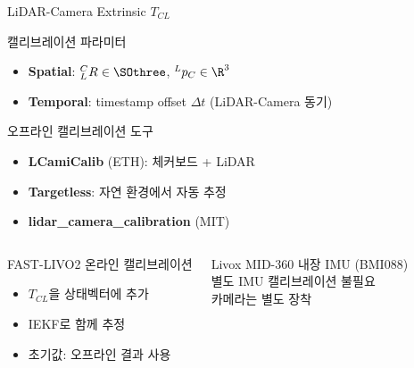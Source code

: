 \begin{frame}{LiDAR-Camera Extrinsic $T_{CL}$}
  \begin{block}{캘리브레이션 파라미터}
    \begin{itemize}
      \item \textbf{Spatial}: ${}^C_LR \in \SOthree$, ${}^Lp_C \in \R^3$
      \item \textbf{Temporal}: timestamp offset $\Delta t$ (LiDAR-Camera 동기)
    \end{itemize}
  \end{block}
  \pause
  \begin{block}{오프라인 캘리브레이션 도구}
    \begin{itemize}
      \item \textbf{LCamiCalib} (ETH): 체커보드 + LiDAR
      \item \textbf{Targetless}: 자연 환경에서 자동 추정
      \item \textbf{lidar\_camera\_calibration} (MIT)
    \end{itemize}
  \end{block}
  \pause
  \begin{columns}
    \begin{block}{FAST-LIVO2 온라인 캘리브레이션}
      \begin{itemize}
        \item $T_{CL}$을 상태벡터에 추가
        \item IEKF로 함께 추정
        \item 초기값: 오프라인 결과 사용
      \end{itemize}
    \end{block}
    \begin{exampleblock}{Livox MID-360}
      내장 IMU (BMI088)\\
      별도 IMU 캘리브레이션 불필요\\
      카메라는 별도 장착
    \end{exampleblock}
  \end{columns}
\end{frame}


